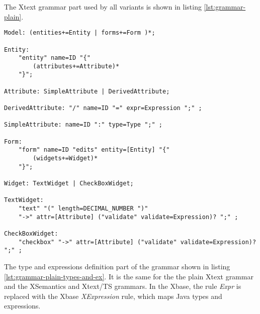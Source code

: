 The Xtext grammar part used by all variants is shown in listing \ref{lst:grammar-plain}. 

%

\begin{lstlisting}[language=xtext,float,label=lst:grammar-plain,caption=Grammar with plain Xtext] 
Model: (entities+=Entity | forms+=Form )*;

Entity:
	"entity" name=ID "{"
		(attributes+=Attribute)*
	"}";

Attribute: SimpleAttribute | DerivedAttribute;

DerivedAttribute: "/" name=ID "=" expr=Expression ";" ;

SimpleAttribute: name=ID ":" type=Type ";" ;

Form:
	"form" name=ID "edits" entity=[Entity] "{"	
		(widgets+=Widget)*
	"}";

Widget: TextWidget | CheckBoxWidget;

TextWidget:
	"text" "(" length=DECIMAL_NUMBER ")" 
	"->" attr=[Attribute] ("validate" validate=Expression)? ";" ;

CheckBoxWidget:
	"checkbox" "->" attr=[Attribute] ("validate" validate=Expression)? ";" ;
\end{lstlisting}

The type and expressions definition part of the grammar shown in listing \ref{lst:grammar-plain-types-and-ex}. It is the same for the the plain Xtext grammar and the XSemantics and Xtext/TS grammars. In the Xbase, the rule \emph{Expr} is replaced with the Xbase \emph{XExpression} rule, which maps Java types and expressions.

